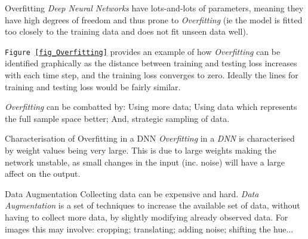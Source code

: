 \documentclass[11pt,a4paper]{article}
\begin{document}
  \begin{proposition}{Overfitting}
    \textit{Deep Neural Networks} have lots-and-lots of parameters, meaning they have high degrees of freedom and thus prone to \textit{Overfitting} (ie the model is fitted too closely to the training data and does not fit unseen data well).
    \par \texttt{Figure \ref{fig_Overfitting}} provides an example of how \textit{Overfitting} can be identified graphically as the distance between training and testing loss increases with each time step, and the training loss converges to zero. Ideally the lines for training and testing loss would be fairly similar.
    \par \textit{Overfitting} can be combatted by: Using more data; Using data which represents the full sample space better; And, strategic sampling of data.
  \end{proposition}

  \begin{remark}{Characterisation of Overfitting in a DNN}
    \textit{Overfitting} in a \textit{DNN} is characterised by weight values being very large. This is due to large weights making the network unstable, as small changes in the input (inc. noise) will have a large affect on the output.
  \end{remark}

  \begin{definition}{Data Augmentation}
    Collecting data can be expensive and hard. \textit{Data Augmentation} is a set of techniques to increase the available set of data, without having to collect more data, by slightly modifying already observed data. For images this may involve: cropping; translating; adding noise; shifting the hue...
  \end{definition}
\end{document}
